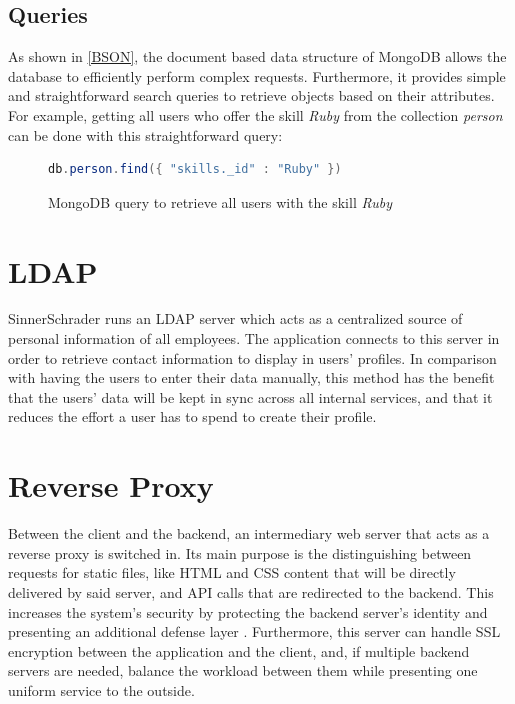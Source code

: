 \newpage



\subsection{Queries}
As shown in \ref{BSON}, the document based data structure of MongoDB allows the database to efficiently perform complex requests. Furthermore, it provides simple and straightforward search queries to retrieve objects based on their attributes. For example, getting all users who offer the skill \textit{Ruby} from the collection \textit{person} can be done with this straightforward query:
\begin{figure}[h]
\begin{lstlisting}[language=Java]
db.person.find({ "skills._id" : "Ruby" })
\end{lstlisting}
\caption[Example Database Query]{MongoDB query to retrieve all users with the skill \textit{Ruby}}
\end{figure}

\section{LDAP}
SinnerSchrader runs an LDAP server which acts as a centralized source of personal information of all employees. The application connects to this server in order to retrieve contact information to display in users' profiles. In comparison with having the users to enter their data manually, this method has the benefit that the users' data will be kept in sync across all internal services, and that it reduces the effort a user has to spend to create their profile.

\section{Reverse Proxy}
Between the client and the backend, an intermediary web server that acts as a reverse proxy is switched in. Its main purpose is the distinguishing between requests for static files, like HTML and CSS content that will be directly delivered by said server, and API calls that are redirected to the backend. This increases the system's security by protecting the backend server's identity and presenting an additional defense layer \cite{NGINX}. Furthermore, this server can handle SSL encryption between the application and the client, and, if multiple backend servers are needed, balance the workload between them while presenting one uniform service to the outside.

